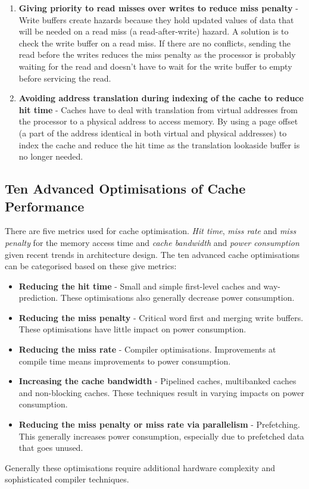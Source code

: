 \documentclass[11pt]{article}
\begin{document}
\begin{enumerate}
\item \textbf{Giving priority to read misses over writes to reduce miss penalty} - Write buffers create hazards because they hold updated values of data that will be needed on a read miss (a read-after-write) hazard. A solution is to check the write buffer on a read miss. If there are no conflicts, sending the read before the writes reduces the miss penalty as the processor is probably waiting for the read and doesn't have to wait for the write buffer to empty before servicing the read.
\item \textbf{Avoiding address translation during indexing of the cache to reduce hit time} - Caches have to deal with translation from virtual addresses from the processor to a physical address to access memory. By using a page offset (a part of the address identical in both virtual and physical addresses) to index the cache and reduce the hit time as the translation lookaside buffer is no longer needed. 
\end{enumerate}
\subsection{Ten Advanced Optimisations of Cache Performance}
There are five metrics used for cache optimisation. \textit{Hit time}, \textit{miss rate} and \textit{miss penalty} for the memory access time and \textit{cache bandwidth} and \textit{power consumption} given recent trends in architecture design. The ten advanced cache optimisations can be categorised based on these give metrics:
\begin{itemize}
\item \textbf{Reducing the hit time} - Small and simple first-level caches and way-prediction. These optimisations also generally decrease power consumption.
\item \textbf{Reducing the miss penalty} - Critical word first and merging write buffers. These optimisations have little impact on power consumption.
\item \textbf{Reducing the miss rate} - Compiler optimisations. Improvements at compile time means improvements to power consumption. 
\item \textbf{Increasing the cache bandwidth} - Pipelined caches, multibanked caches and non-blocking caches. These techniques result in varying impacts on power consumption. 
\item \textbf{Reducing the miss penalty or miss rate via parallelism} - Prefetching. This generally increases power consumption, especially due to prefetched data that goes unused.
\end{itemize}
Generally these optimisations require additional hardware complexity and sophisticated compiler techniques. 
\end{document}
